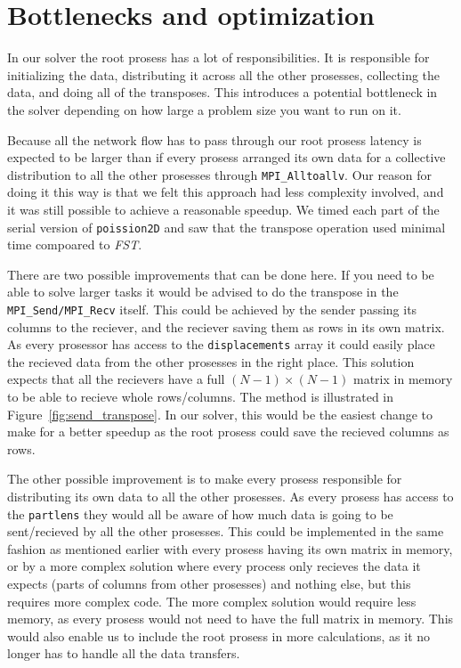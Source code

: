 
\clearpage
\section{Bottlenecks and optimization} %
\label{sec:bottlenecks_and_optimization}

In our solver the root prosess has a lot of responsibilities. It is responsible for initializing the data, distributing it across all the other prosesses, collecting the data, and doing all of the transposes. This introduces a potential bottleneck in the solver depending on how large a problem size you want to run on it.

Because all the network flow has to pass through our root prosess latency is expected to be larger than if every prosess arranged its own data for a collective distribution to all the other prosesses through \texttt{MPI\_Alltoallv}. Our reason for doing it this way is that we felt this approach had less complexity involved, and it was still possible to achieve a reasonable speedup. We timed each part of the serial version of \texttt{poission2D} and saw that the transpose operation used minimal time compoared to \emph{FST}.

There are two possible improvements that can be done here. If you need to be able to solve larger tasks it would be advised to do the transpose in the \texttt{MPI\_Send/MPI\_Recv} itself. This could be achieved by the sender passing its columns to the reciever, and the reciever saving them as rows in its own matrix. As every prosessor has access to the \texttt{displacements} array it could easily place the recieved data from the other prosesses in the right place. This solution expects that all the recievers have a full $(N-1)\times(N-1)$ matrix in memory to be able to recieve whole rows/columns. The method is illustrated in Figure~\ref{fig:send_transpose}. In our solver, this would be the easiest change to make for a better speedup as the root prosess could save the recieved columns as rows.

The other possible improvement is to make every prosess responsible for distributing its own data to all the other prosesses. As every prosess has access to the \texttt{partlens} they would all be aware of how much data is going to be sent/recieved by all the other prosesses. This could be implemented in the same fashion as mentioned earlier with every prosess having its own matrix in memory, or by a more complex solution where every process only recieves the data it expects (parts of columns from other prosesses) and nothing else, but this requires more complex code. The more complex solution would require less memory, as every prosess would not need to have the full matrix in memory. This would also enable us to include the root prosess in more calculations, as it no longer has to handle all the data transfers.

